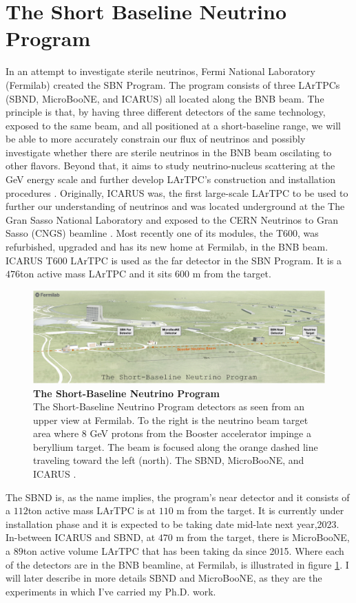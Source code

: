 \section{The Short Baseline Neutrino Program}
%
In an attempt to investigate sterile neutrinos, Fermi National Laboratory (Fermilab) created the SBN Program. The program consists of three LArTPCs (SBND, MicroBooNE, and ICARUS) all located along the BNB beam. The principle is that, by having three different detectors of the same technology, exposed to the same beam, and all positioned at a short-baseline range, we will be able to more accurately constrain our flux of neutrinos and possibly investigate whether there are sterile neutrinos in the BNB beam oscilating to other flavors. Beyond that, it aims to study neutrino-nucleus scattering at the GeV energy scale and further develop LArTPC's construction and installation procedures \cite{SBN}.
%
Originally, ICARUS was, the first large-scale LArTPC to be used to further our understanding of neutrinos and was located underground at the The Gran Sasso National Laboratory and exposed to the CERN Neutrinos to Gran Sasso (CNGS) beamline \cite{ICARUS_proposal}. Most recently one of its modules, the T600, was refurbished, upgraded and has its new home at Fermilab, in the BNB beam. ICARUS T600 LArTPC is used as the far detector in the SBN Program. It is a $476$ton active mass LArTPC and it sits $600$ m from the target. 
%
\begin{figure}[h!]
	\begin{center}
		\includegraphics[scale=0.32]{Figures/SBN.png}
		\caption[The Short-Baseline Neutrino Program]{\textbf{The Short-Baseline Neutrino Program}\\The Short-Baseline Neutrino Program detectors as seen from an upper view at Fermilab. To the right is the neutrino beam target area where $8$ GeV protons from the Booster accelerator impinge a beryllium target. The beam is focused along the orange dashed line traveling toward the left (north). The SBND, MicroBooNE, and ICARUS \cite{SBN}.
		}
		\label{sbn_program}
	\end{center}
\end{figure}
%
The SBND is, as the name implies, the program's near detector and it consists of a $112$ton active mass LArTPC is at $110$ m from the target. It is currently under  installation phase and it is expected to be taking date mid-late next year,2023. In-between ICARUS and SBND, at $470$ m from the target, there is MicroBooNE, a $89$ton active volume LArTPC that has been taking da since 2015. Where each of the detectors are in the BNB beamline, at Fermilab, is illustrated in figure \ref{sbn_program}.
I will later describe in more details SBND and MicroBooNE, as they are the experiments in which I've carried my Ph.D. work. 
%
